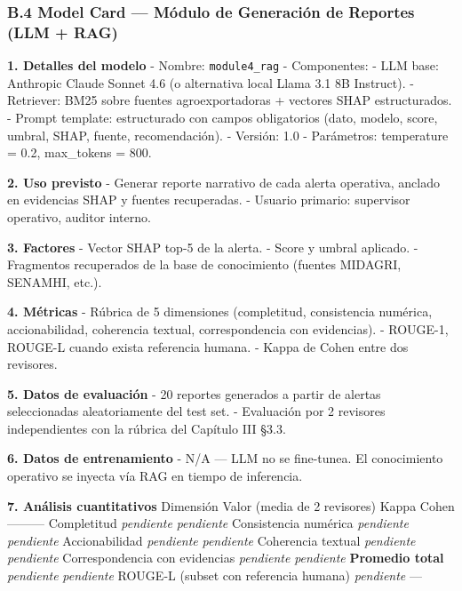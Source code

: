 \subsubsection{B.4 Model Card --- Módulo de Generación de Reportes (LLM
+
RAG)}\label{b.4-model-card-muxf3dulo-de-generaciuxf3n-de-reportes-llm-rag}

\textbf{1. Detalles del modelo} - Nombre: \texttt{module4\_rag} -
Componentes: - LLM base: Anthropic Claude Sonnet 4.6 (o alternativa
local Llama 3.1 8B Instruct). - Retriever: BM25 sobre fuentes
agroexportadoras + vectores SHAP estructurados. - Prompt template:
estructurado con campos obligatorios (dato, modelo, score, umbral, SHAP,
fuente, recomendación). - Versión: 1.0 - Parámetros: temperature = 0.2,
max\_tokens = 800.

\textbf{2. Uso previsto} - Generar reporte narrativo de cada alerta
operativa, anclado en evidencias SHAP y fuentes recuperadas. - Usuario
primario: supervisor operativo, auditor interno.

\textbf{3. Factores} - Vector SHAP top-5 de la alerta. - Score y umbral
aplicado. - Fragmentos recuperados de la base de conocimiento (fuentes
MIDAGRI, SENAMHI, etc.).

\textbf{4. Métricas} - Rúbrica de 5 dimensiones (completitud,
consistencia numérica, accionabilidad, coherencia textual,
correspondencia con evidencias). - ROUGE-1, ROUGE-L cuando exista
referencia humana. - Kappa de Cohen entre dos revisores.

\textbf{5. Datos de evaluación} - 20 reportes generados a partir de
alertas seleccionadas aleatoriamente del test set. - Evaluación por 2
revisores independientes con la rúbrica del Capítulo III §3.3.

\textbf{6. Datos de entrenamiento} - N/A --- LLM no se fine-tunea. El
conocimiento operativo se inyecta vía RAG en tiempo de inferencia.

\textbf{7. Análisis cuantitativos} \textbar{} Dimensión \textbar{} Valor
(media de 2 revisores) \textbar{} Kappa Cohen \textbar{}
\textbar---\textbar---\textbar---\textbar{} \textbar{} Completitud
\textbar{} \emph{pendiente} \textbar{} \emph{pendiente} \textbar{}
\textbar{} Consistencia numérica \textbar{} \emph{pendiente} \textbar{}
\emph{pendiente} \textbar{} \textbar{} Accionabilidad \textbar{}
\emph{pendiente} \textbar{} \emph{pendiente} \textbar{} \textbar{}
Coherencia textual \textbar{} \emph{pendiente} \textbar{}
\emph{pendiente} \textbar{} \textbar{} Correspondencia con evidencias
\textbar{} \emph{pendiente} \textbar{} \emph{pendiente} \textbar{}
\textbar{} \textbf{Promedio total} \textbar{} \emph{pendiente}
\textbar{} \emph{pendiente} \textbar{} \textbar{} ROUGE-L (subset con
referencia humana) \textbar{} \emph{pendiente} \textbar{} --- \textbar{}

